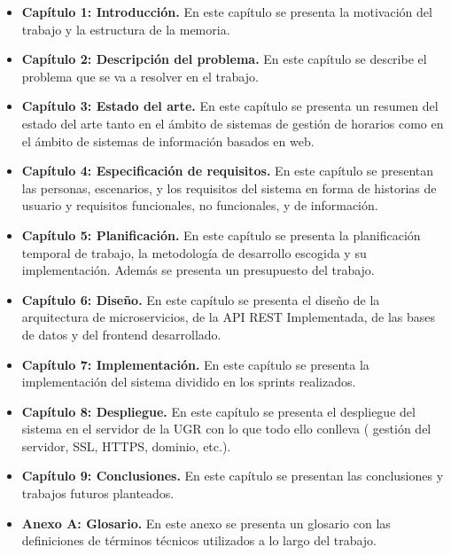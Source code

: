\begin{itemize}
    \item \textbf{Capítulo 1: Introducción.} En este capítulo se presenta la motivación del trabajo y la estructura de la memoria.
    \item \textbf{Capítulo 2: Descripción del problema.} En este capítulo se describe el problema que se va a resolver en el trabajo.
    \item \textbf{Capítulo 3: Estado del arte.} En este capítulo se presenta un resumen del estado del arte tanto en el ámbito de sistemas de gestión de horarios como en el ámbito de sistemas de información basados en web.
    \item \textbf{Capítulo 4: Especificación de requisitos.} En este capítulo se presentan las personas, escenarios, y los requisitos del sistema en forma de historias de usuario y requisitos funcionales, no funcionales, y de información.
    \item \textbf{Capítulo 5: Planificación.} En este capítulo se presenta la planificación temporal de trabajo, la metodología de desarrollo escogida y su implementación. Además se presenta un presupuesto del trabajo.
    \item \textbf{Capítulo 6: Diseño.} En este capítulo se presenta el diseño de la arquitectura de microservicios, de la API REST Implementada, de las bases de datos y del frontend desarrollado.
    \item \textbf{Capítulo 7: Implementación.} En este capítulo se presenta la implementación del sistema dividido en los sprints realizados.
    \item \textbf{Capítulo 8: Despliegue.} En este capítulo se presenta el despliegue del sistema en el servidor de la UGR con lo que todo ello conlleva ( gestión del servidor, SSL, HTTPS, dominio, etc.).
    \item \textbf{Capítulo 9: Conclusiones.} En este capítulo se presentan las conclusiones y trabajos futuros planteados.
    \item \textbf{Anexo A: Glosario.} En este anexo se presenta un glosario con las definiciones de términos técnicos utilizados a lo largo del trabajo.
\end{itemize}
